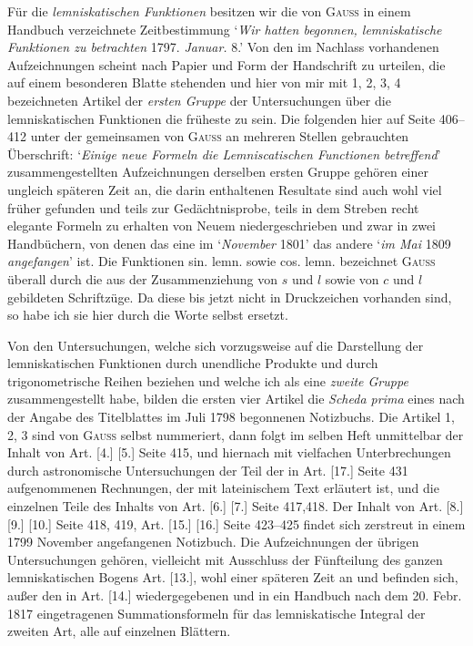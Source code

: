 \medskip
Für die \textit{lemniskatischen Funktionen} besitzen wir die von \textsc{Gauss} in einem Handbuch verzeichnete Zeitbestimmung `\textit{Wir hatten begonnen, lemniskatische Funktionen zu betrachten} 1797. \textit{Januar.} 8.' Von den im Nachlass vorhandenen Aufzeichnungen scheint nach Papier und Form der Handschrift zu urteilen, die auf einem besonderen Blatte stehenden und hier von mir mit 1, 2, 3, 4 bezeichneten Artikel der \textit{ersten Gruppe} der Untersuchungen über die lemniskatischen Funktionen die früheste zu sein. Die folgenden hier auf Seite 406--412 unter der gemeinsamen von \textsc{Gauss} an mehreren Stellen gebrauchten Überschrift: `\textit{Einige neue Formeln die Lemniscatischen Functionen betreffend}' zusammengestellten Aufzeichnungen derselben ersten Gruppe gehören einer ungleich späteren Zeit an, die darin enthaltenen Resultate sind auch wohl viel früher gefunden und teils zur Gedächtnisprobe, teils in dem Streben recht elegante Formeln zu erhalten von Neuem niedergeschrieben und zwar in zwei Handbüchern, von denen das eine im `\textit{November} 1801' das andere `\textit{im Mai} 1809 \textit{angefangen}' ist. Die Funktionen sin. lemn. sowie cos. lemn. bezeichnet \textsc{Gauss} überall durch die aus der Zusammenziehung von \(s\) und \(l\) sowie von \(c\) und \(l\) gebildeten Schriftzüge. Da diese bis jetzt nicht in Druckzeichen vorhanden sind, so habe ich sie hier durch die Worte selbst ersetzt.


Von den Untersuchungen, welche sich vorzugsweise auf die Darstellung der lemniskatischen Funktionen durch unendliche Produkte und durch trigonometrische Reihen beziehen und welche ich als eine \textit{zweite Gruppe} zusammengestellt habe, bilden die ersten vier Artikel die \textit{Scheda prima} eines nach der Angabe des Titelblattes im Juli 1798 begonnenen Notizbuchs. Die Artikel 1, 2, 3 sind von \textsc{Gauss} selbst nummeriert, dann folgt im selben Heft unmittelbar der Inhalt von Art. [4.] [5.] Seite 415, und hiernach mit vielfachen Unterbrechungen durch astronomische Untersuchungen der Teil der in Art. [17.] Seite 431 aufgenommenen Rechnungen, der mit lateinischem Text erläutert ist, und die einzelnen Teile des Inhalts von Art. [6.] [7.] Seite 417,418. Der Inhalt von Art. [8.] [9.] [10.] Seite 418, 419, Art. [15.] [16.] Seite 423--425 findet sich zerstreut in einem 1799 November angefangenen Notizbuch. Die Aufzeichnungen der übrigen Untersuchungen gehören, vielleicht mit Ausschluss der Fünfteilung des ganzen lemniskatischen Bogens Art. [13.], wohl einer späteren Zeit an und befinden sich, außer den in Art. [14.] wiedergegebenen und in ein Handbuch nach dem 20. Febr. 1817 eingetragenen Summationsformeln für das lemniskatische Integral der zweiten Art, alle auf einzelnen Blättern.

